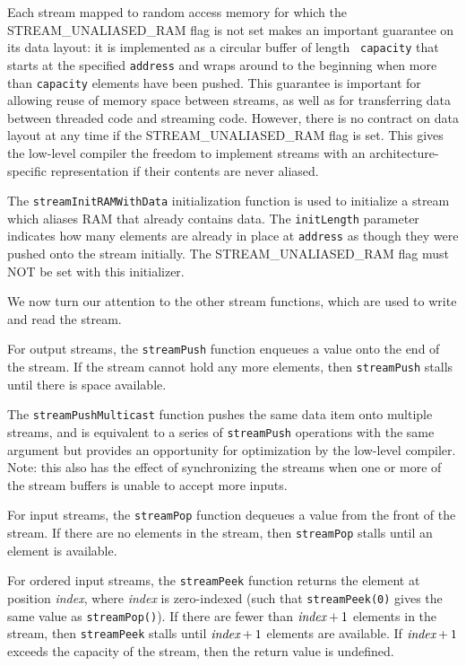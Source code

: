 Each stream mapped to random access memory for which the
STREAM\_UNALIASED\_RAM flag is not set makes an important guarantee on
its data layout: it is implemented as a circular buffer of length {\tt
capacity} that starts at the specified {\tt address} and wraps around
to the beginning when more than {\tt capacity} elements have been
pushed.  This guarantee is important for allowing reuse of memory
space between streams, as well as for transferring data between
threaded code and streaming code.  However, there is no contract on
data layout at any time if the STREAM\_UNALIASED\_RAM flag is
set. This gives the low-level compiler the freedom to implement
streams with an architecture-specific representation if their contents
are never aliased.

The {\tt streamInitRAMWithData} initialization function is used to
initialize a stream which aliases RAM that already contains data.  The
{\tt initLength} parameter indicates how many elements are already in
place at {\tt address} as though they were pushed onto the stream
initially. The STREAM\_UNALIASED\_RAM flag must NOT be set with this
initializer.


We now turn our attention to the other stream functions, which are
used to write and read the stream.

 For output streams, the {\tt streamPush} function
enqueues a value onto the end of the stream.  If the stream cannot
hold any more elements, then {\tt streamPush} stalls until there is
space available.

 The {\tt streamPushMulticast} function
pushes the same data item onto multiple streams, and is equivalent to
a series of {\tt streamPush} operations with the same argument but
provides an opportunity for optimization by the low-level compiler.
Note: this also has the effect of synchronizing the streams when one
or more of the stream buffers is unable to accept more inputs.

 For input streams, the {\tt streamPop} function
dequeues a value from the front of the stream.  If there are no
elements in the stream, then {\tt streamPop} stalls until an element
is available.

 For ordered input streams, the {\tt streamPeek}
function returns the element at position {\it index}, where {\it
index} is zero-indexed (such that {\tt streamPeek(0)} gives the same
value as {\tt streamPop()}).  If there are fewer than $\mbox{\it index}+1$
elements in the stream, then {\tt streamPeek} stalls until
$\mbox{\it index}+1$ elements are available. If $\mbox{\it index}+1$ exceeds the
capacity of the stream, then the return value is undefined.

